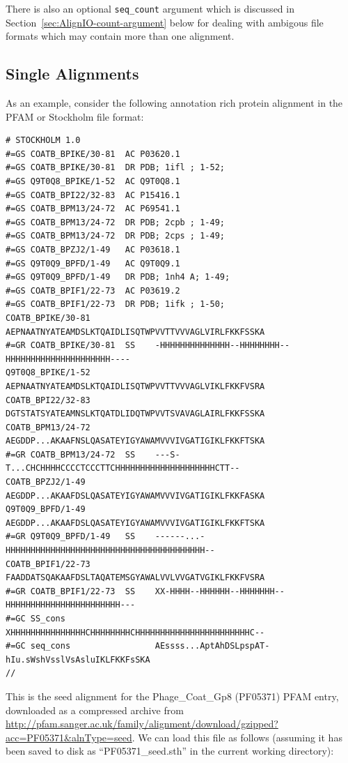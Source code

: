 \documentclass{report}
\begin{document}
\noindent There is also an optional \verb|seq_count| argument which is discussed in Section~\ref{sec:AlignIO-count-argument} below for dealing with ambigous file formats which may contain more than one alignment.

\subsection{Single Alignments}
As an example, consider the following annotation rich protein alignment in the PFAM or Stockholm file format:

\begin{verbatim}
# STOCKHOLM 1.0
#=GS COATB_BPIKE/30-81  AC P03620.1
#=GS COATB_BPIKE/30-81  DR PDB; 1ifl ; 1-52;
#=GS Q9T0Q8_BPIKE/1-52  AC Q9T0Q8.1
#=GS COATB_BPI22/32-83  AC P15416.1
#=GS COATB_BPM13/24-72  AC P69541.1
#=GS COATB_BPM13/24-72  DR PDB; 2cpb ; 1-49;
#=GS COATB_BPM13/24-72  DR PDB; 2cps ; 1-49;
#=GS COATB_BPZJ2/1-49   AC P03618.1
#=GS Q9T0Q9_BPFD/1-49   AC Q9T0Q9.1
#=GS Q9T0Q9_BPFD/1-49   DR PDB; 1nh4 A; 1-49;
#=GS COATB_BPIF1/22-73  AC P03619.2
#=GS COATB_BPIF1/22-73  DR PDB; 1ifk ; 1-50;
COATB_BPIKE/30-81             AEPNAATNYATEAMDSLKTQAIDLISQTWPVVTTVVVAGLVIRLFKKFSSKA
#=GR COATB_BPIKE/30-81  SS    -HHHHHHHHHHHHHH--HHHHHHHH--HHHHHHHHHHHHHHHHHHHHH----
Q9T0Q8_BPIKE/1-52             AEPNAATNYATEAMDSLKTQAIDLISQTWPVVTTVVVAGLVIKLFKKFVSRA
COATB_BPI22/32-83             DGTSTATSYATEAMNSLKTQATDLIDQTWPVVTSVAVAGLAIRLFKKFSSKA
COATB_BPM13/24-72             AEGDDP...AKAAFNSLQASATEYIGYAWAMVVVIVGATIGIKLFKKFTSKA
#=GR COATB_BPM13/24-72  SS    ---S-T...CHCHHHHCCCCTCCCTTCHHHHHHHHHHHHHHHHHHHHCTT--
COATB_BPZJ2/1-49              AEGDDP...AKAAFDSLQASATEYIGYAWAMVVVIVGATIGIKLFKKFASKA
Q9T0Q9_BPFD/1-49              AEGDDP...AKAAFDSLQASATEYIGYAWAMVVVIVGATIGIKLFKKFTSKA
#=GR Q9T0Q9_BPFD/1-49   SS    ------...-HHHHHHHHHHHHHHHHHHHHHHHHHHHHHHHHHHHHHHHH--
COATB_BPIF1/22-73             FAADDATSQAKAAFDSLTAQATEMSGYAWALVVLVVGATVGIKLFKKFVSRA
#=GR COATB_BPIF1/22-73  SS    XX-HHHH--HHHHHH--HHHHHHH--HHHHHHHHHHHHHHHHHHHHHHH---
#=GC SS_cons                  XHHHHHHHHHHHHHHHCHHHHHHHHCHHHHHHHHHHHHHHHHHHHHHHHC--
#=GC seq_cons                 AEssss...AptAhDSLpspAT-hIu.sWshVsslVsAsluIKLFKKFsSKA
//
\end{verbatim}

This is the seed alignment for the Phage\_Coat\_Gp8 (PF05371) PFAM entry, downloaded as a compressed archive from \url{http://pfam.sanger.ac.uk/family/alignment/download/gzipped?acc=PF05371&alnType=seed}.  We can load this file as follows (assuming it has been saved to disk as ``PF05371\_seed.sth'' in the current working directory):
\end{document}
